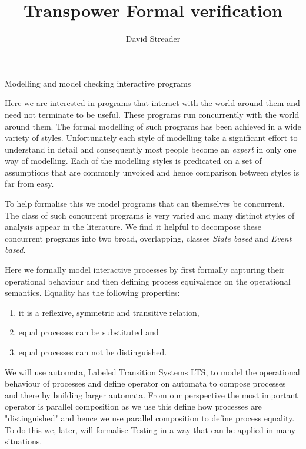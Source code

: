 \documentclass[]{article}
\begin{document}
\pagestyle{empty} %



\title{Transpower Formal verification}
\author{David Streader}

\pagestyle{plain} %

{\LARGE \bf
\begin{center}
Modelling  and model checking interactive programs
\end{center}
}



Here we are interested in programs that interact with the world around them and need not terminate to be useful. These programs  run concurrently with the world around them. The formal modelling   of such programs has been achieved in a wide variety of styles. Unfortunately each style of modelling take a significant effort to understand in detail and consequently most people become an \emph{expert} in only one way of modelling. Each of the modelling styles  is predicated on a set of assumptions that are commonly unvoiced and hence comparison between styles is far from easy.



To help formalise this we  model programs that can themselves be concurrent. The class of such concurrent programs is very varied  and many distinct styles of analysis appear in the literature.  We find it helpful to decompose these concurrent programs into two broad, overlapping,  classes \emph{State based} and \emph{Event based}.

Here we  formally model interactive processes by first formally capturing their operational behaviour and then defining  process equivalence on the operational semantics. Equality  has the following properties:
\begin{enumerate}
\item it is a reflexive, symmetric and transitive relation,
\item equal processes can be substituted and
\item equal processes can not  be distinguished.
\end{enumerate}


We will use automata, Labeled Transition Systems LTS, to model the operational behaviour of processes and define operator on automata to compose processes and there by building larger automata. From our perspective the most important operator is parallel composition as we use this define how processes are "distinguished" and hence we use parallel composition to define process equality. To do this we, later,  will formalise Testing in a way that can be applied in many situations.
\end{document}
